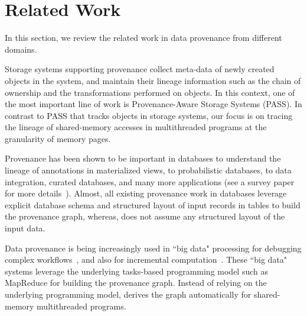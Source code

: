 \section{Related Work}
\label{sec:related}





In this section, we review the related work in data provenance from different domains.




 Storage systems supporting provenance collect meta-data of newly created objects in the system, %
and  maintain their lineage information such as the chain of ownership and the transformations performed on objects. In this context, one of the most important line of work is Provenance-Aware Storage Systems (PASS).  
In contrast to PASS that tracks objects in storage systems, our focus is on tracing the lineage of shared-memory accesses in multithreaded programs at the granularity of memory pages. %
\fi

 Provenance has been shown to be important in databases to understand the lineage of annotations in materialized views,  to probabilistic databases, to data integration, curated databases, and many more applications (see a survey paper for more details~\cite{provenance-database-tutorial}). Almost, all existing provenance work in databases leverage explicit database schema and structured layout of input records in tables to build the provenance graph, whereas, \projecttitle does not assume any structured layout of the input data.

 
 Data provenance is being increasingly used in ``big data"  processing for  debugging complex workflows~\cite{nova}, and also for incremental computation~\cite{incoop}.  These ``big data" systems leverage the underlying tasks-based programming model such as MapReduce for building the provenance graph. 
Instead of relying on the underlying programming model,  \projecttitle derives the graph automatically for shared-memory multithreaded programs.



